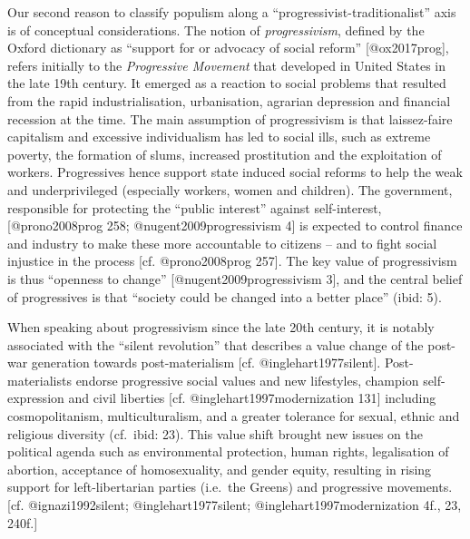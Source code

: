\documentclass[]{article}
\begin{document}
Our second reason to classify populism along a
``progressivist-traditionalist'' axis is of conceptual considerations.
The notion of \emph{progressivism}, defined by the Oxford dictionary as
``support for or advocacy of social reform'' {[}@ox2017prog{]}, refers
initially to the \emph{Progressive Movement} that developed in United
States in the late 19th century. It emerged as a reaction to social
problems that resulted from the rapid industrialisation, urbanisation,
agrarian depression and financial recession at the time. The main
assumption of progressivism is that laissez-faire capitalism and
excessive individualism has led to social ills, such as extreme poverty,
the formation of slums, increased prostitution and the exploitation of
workers. Progressives hence support state induced social reforms to help
the weak and underprivileged (especially workers, women and children).
The government, responsible for protecting the ``public interest''
against self-interest, {[}@prono2008prog 258; @nugent2009progressivism
4{]} is expected to control finance and industry to make these more
accountable to citizens -- and to fight social injustice in the process
{[}cf. @prono2008prog 257{]}. The key value of progressivism is thus
``openness to change'' {[}@nugent2009progressivism 3{]}, and the central
belief of progressives is that ``society could be changed into a better
place'' (ibid: 5).

When speaking about progressivism since the late 20th century, it is
notably associated with the ``silent revolution'' that describes a value
change of the post-war generation towards post-materialism {[}cf.
@inglehart1977silent{]}. Post-materialists endorse progressive social
values and new lifestyles, champion self-expression and civil liberties
{[}cf. @inglehart1997modernization 131{]} including cosmopolitanism,
multiculturalism, and a greater tolerance for sexual, ethnic and
religious diversity (cf.~ibid: 23). This value shift brought new issues
on the political agenda such as environmental protection, human rights,
legalisation of abortion, acceptance of homosexuality, and gender
equity, resulting in rising support for left-libertarian parties
(i.e.~the Greens) and progressive movements. {[}cf. @ignazi1992silent;
@inglehart1977silent; @inglehart1997modernization 4f., 23, 240f.{]}
\end{document}
